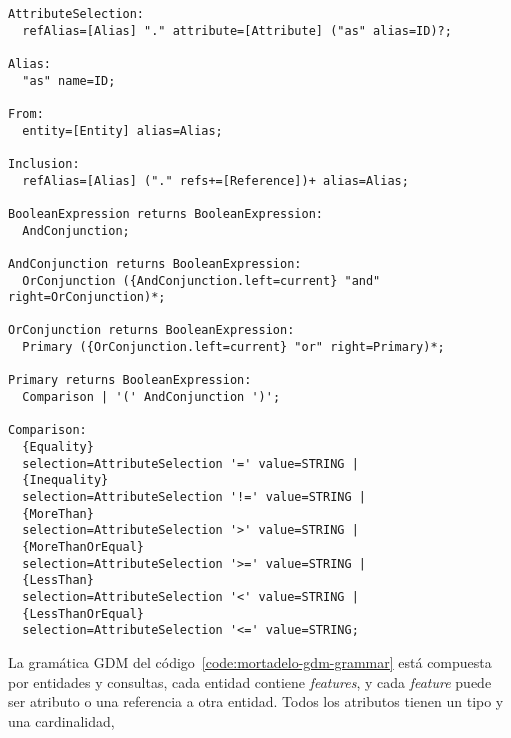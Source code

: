 \begin{code}
\begin{verbatim}
AttributeSelection:
  refAlias=[Alias] "." attribute=[Attribute] ("as" alias=ID)?;

Alias:
  "as" name=ID;

From:
  entity=[Entity] alias=Alias;

Inclusion:
  refAlias=[Alias] ("." refs+=[Reference])+ alias=Alias;

BooleanExpression returns BooleanExpression:
  AndConjunction;

AndConjunction returns BooleanExpression:
  OrConjunction ({AndConjunction.left=current} "and" right=OrConjunction)*;

OrConjunction returns BooleanExpression:
  Primary ({OrConjunction.left=current} "or" right=Primary)*;

Primary returns BooleanExpression:
  Comparison | '(' AndConjunction ')';

Comparison:
  {Equality}
  selection=AttributeSelection '=' value=STRING |
  {Inequality}
  selection=AttributeSelection '!=' value=STRING |
  {MoreThan}
  selection=AttributeSelection '>' value=STRING |
  {MoreThanOrEqual}
  selection=AttributeSelection '>=' value=STRING |
  {LessThan}
  selection=AttributeSelection '<' value=STRING |
  {LessThanOrEqual}
  selection=AttributeSelection '<=' value=STRING;
\end{verbatim}
\end{code}

La gramática GDM del código~\ref{code:mortadelo-gdm-grammar} está compuesta por entidades y consultas, cada entidad contiene \textit{features}, y cada \textit{feature} puede ser atributo o una referencia a otra entidad. Todos los atributos tienen un tipo y una cardinalidad,
